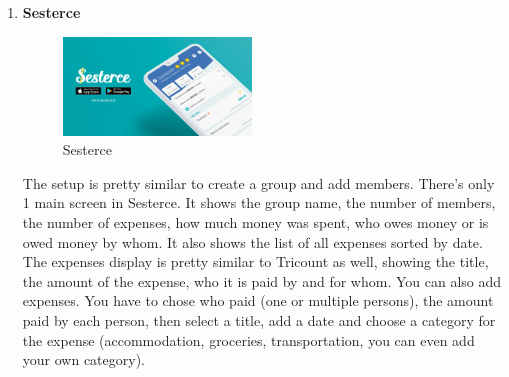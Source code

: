 \documentclass[conference]{IEEEtran}
\begin{document}
\begin{enumerate}
    \item\textbf{Sesterce} \\
        \begin{figure}[htbp]
            \centerline{\includegraphics[width=50mm,scale=0.5]{img/logo-sesterce.png}}
            \caption{Sesterce}
            \label{fig:my_label}
        \end{figure}
        \newline
        The setup is pretty similar to create a group and add members.
        \newline
        There's only 1 main screen in Sesterce. It shows the group name, the number of members, the number of expenses, how much money was spent, who owes money or is owed money by whom. It also shows the list of all expenses sorted by date. The expenses display is pretty similar to Tricount as well, showing the title, the amount of the expense, who it is paid by and for whom. You can also add expenses. You have to chose who paid (one or multiple persons), the amount paid by each person, then select a title, add a date and choose a category for the expense (accommodation, groceries, transportation, you can even add your own category).  
\end{enumerate}

\newpage
\end{document}
